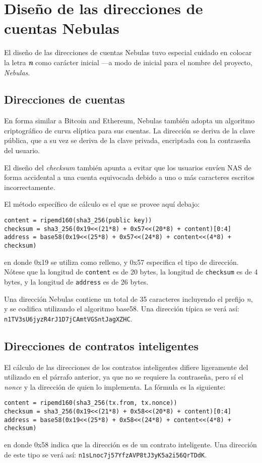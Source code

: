 \section{Diseño de las direcciones de cuentas Nebulas}

El diseño de las direcciones de cuentas Nebulas tuvo especial cuidado en colocar la letra \textbf{\textit{n}} como carácter inicial —a modo de inicial para el nombre del proyecto, \textit{Nebulas}.

\subsection{Direcciones de cuentas}

En forma similar a Bitcoin and Ethereum, Nebulas también adopta un algoritmo criptográfico de curva elíptica para sus cuentas. La dirección se deriva de la clave pública, que a su vez se deriva de la clave privada, encriptada con la contraseña del usuario.

El diseño del \textit{checksum} también apunta a evitar que los usuarios envíen NAS de forma accidental a una cuenta equivocada debido a uno o más caracteres escritos incorrectamente.

El método específico de cálculo es el que se provee aquí debajo:

\begin{verbatim}
content = ripemd160(sha3_256(public key))
checksum = sha3_256(0x19<<(21*8) + 0x57<<(20*8) + content)[0:4]
address = base58(0x19<<(25*8) + 0x57<<(24*8) + content<<(4*8) + checksum)
\end{verbatim}

\noindent en donde 0x19 se utiliza como relleno, y 0x57 especifica el tipo de dirección. Nótese que la longitud de \texttt{content} es de 20 bytes, la longitud de \texttt{checksum} es de 4 bytes, y la longitud de \texttt{address} es de 26 bytes.

Una dirección Nebulas contiene un total de 35 caracteres incluyendo el prefijo \textit{n}, y se codifica utilizando el algoritmo base58. Una dirección típica se verá así: \texttt{n1TV3sU6jyzR4rJ1D7jCAmtVGSntJagXZHC}.

\subsection{Direcciones de contratos inteligentes}
El cálculo de las direcciones de los contratos inteligentes difiere ligeramente del utilizado en el párrafo anterior, ya que no se requiere la contraseña, pero sí el \textit{nonce} y la dirección de quien lo implementa. La fórmula es la siguiente:

\begin{verbatim}
content = ripemd160(sha3_256(tx.from, tx.nonce))
checksum = sha3_256(0x19<<(21*8) + 0x58<<(20*8) + content)[0:4]
address = base58(0x19<<(25*8) + 0x58<<(24*8) + content<<(4*8) + checksum)
\end{verbatim}

\noindent
en donde 0x58 indica que la dirección es de un contrato inteligente. Una dirección de este tipo se verá así: \texttt{n1sLnoc7j57YfzAVP8tJ3yK5a2i56QrTDdK}.